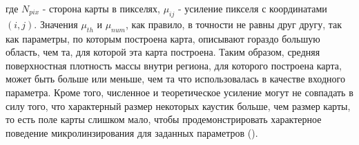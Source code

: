 \noindent где $N_{pix}$ - сторона карты в пикселях, $\mu_{ij}$ - усиление пикселя с координатами $(i,j)$. Значения $\mu_{th}$ и $\mu_{num}$, как правило, в точности не равны друг другу, так как параметры, по которым построена карта, описывают гораздо большую область, чем та, для которой эта карта построена. Таким образом, средняя поверхностная плотность массы внутри региона, для которого построена карта, может быть больше или меньше, чем та что использовалась в качестве входного параметра. Кроме того, численное и теоретическое усиление могут не совпадать в силу того, что характерный размер некоторых каустик больше, чем размер карты, то есть поле карты слишком мало, чтобы продемонстрировать характерное поведение микролинзирования для заданных параметров (\cite{wambsganss1990-thesis}). 


